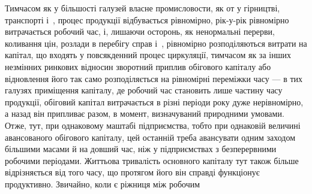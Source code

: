 Тимчасом як у більшості галузей власне промисловости, як от у гірництві,
транспорті і~, процес продукції відбувається рівномірно, рік-у-рік
рівномірно витрачається робочий час, і, лишаючи осторонь, як ненормальні
перерви, коливання цін, розлади в перебігу справ і~, рівномірно
розподіляються витрати на капітал, що входять у повсякденний процес
циркуляції, тимчасом як за інших незмінних ринкових відносин
зворотний приплив обігового капіталу або відновлення його так само
розподіляється на рівномірні переміжки часу — в тих галузях приміщення
капіталу, де робочий час становить лише частину часу продукції, обіговий
капітал витрачається в різні періоди року дуже нерівномірно, а назад
він припливає разом, в момент, визначуваний природними умовами. Отже,
тут, при однаковому маштабі підприємства, тобто при однаковій величині
авансованого обігового капіталу, цей останній треба авансувати одним
заходом більшими масами й на довший час, ніж у підприємствах з безперервними
робочими періодами. Життьова тривалість основного капіталу
тут також більше відрізняється від того часу, що протягом його він
справді функціонує продуктивно. Звичайно, коли є ріжниця між робочим
\parbreak{}  %
